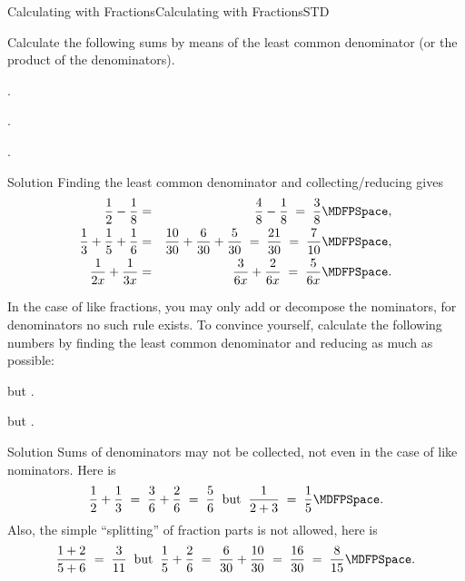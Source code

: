 \begin{MXContent}{Calculating with Fractions}{Calculating with Fractions}{STD}
\begin{MExercise}
Calculate the following sums by means of the least common denominator 
(or the product of the denominators).
\begin{MExerciseItems}
\item{.}
\item{.}
\item{.}
\end{MExerciseItems}

\begin{MHint}{Solution}
Finding the least common denominator and collecting/reducing gives
\begin{eqnarray*}
\Mdfrac12-\Mdfrac18 & = & \Mdfrac48-\Mdfrac18 \;=\; \Mdfrac38 \MDFPSpace ,\\
\Mdfrac13+\Mdfrac15+\Mdfrac16 & = & \Mdfrac{10}{30}+\Mdfrac6{30}+\Mdfrac{5}{30} \;=\; \Mdfrac{21}{30} \;=\; \Mdfrac{7}{10}\MDFPSpace ,\\
\Mdfrac1{2x}+\Mdfrac1{3x} & = & \Mdfrac{3}{6x}+\Mdfrac{2}{6x} \;=\; \Mdfrac{5}{6x} \MDFPSpace .
\end{eqnarray*}
\end{MHint}
\end{MExercise}

\begin{MExercise}
In the case of like fractions, you may only add or decompose the nominators, 
for denominators no such rule exists. To convince yourself, calculate the following numbers
by finding the least common denominator and reducing 
as much as possible:
\begin{MExerciseItems}
\item{ but .}
\item{ but .}
\end{MExerciseItems}
\begin{MHint}{Solution}
Sums of denominators may not be collected, not even in the case of like nominators. Here is
$$
\Mdfrac12+\Mdfrac13\;=\; \Mdfrac{3}{6}+\Mdfrac26 \;=\; \Mdfrac56\;\;\text{but}\;\;
\Mdfrac{1}{2+3} \;=\; \Mdfrac15\MDFPSpace .
$$
Also, the simple ``splitting'' of fraction parts is not allowed, here is
$$
\Mdfrac{1+2}{5+6} \;=\; \Mdfrac{3}{11}  \;\;\text{but}\;\; \Mdfrac15+\Mdfrac26 \;=\; \Mdfrac{6}{30}+\Mdfrac{10}{30} \;=\; \Mdfrac{16}{30}\;=\; \Mdfrac{8}{15}\MDFPSpace .
$$
\end{MHint}
\end{MExercise}


\end{MXContent}
